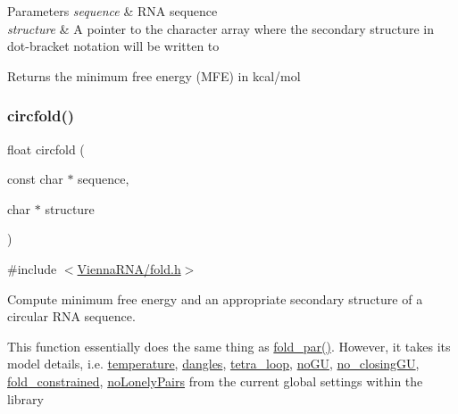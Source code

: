 \begin{DoxyParams}{Parameters}
{\em sequence} & R\+NA sequence \\
\hline
{\em structure} & A pointer to the character array where the secondary structure in dot-\/bracket notation will be written to \\
\hline
\end{DoxyParams}
\begin{DoxyReturn}{Returns}
the minimum free energy (M\+FE) in kcal/mol 
\end{DoxyReturn}
\mbox{\label{group__mfe__global__deprecated_ga4ac63ab3e8d9a80ced28b8052d94e423}} 
\subsubsection{\texorpdfstring{circfold()}{circfold()}}
{\footnotesize\ttfamily float circfold (\begin{DoxyParamCaption}\item[{const char $\ast$}]{sequence,  }\item[{char $\ast$}]{structure }\end{DoxyParamCaption})}



{\ttfamily \#include $<$\hyperlink{fold_8h}{Vienna\+R\+N\+A/fold.\+h}$>$}



Compute minimum free energy and an appropriate secondary structure of a circular R\+NA sequence. 

This function essentially does the same thing as \hyperlink{group__mfe__global__deprecated_ga2bc41df5d71fee6fd8da9904ee65d8fb}{fold\+\_\+par()}. However, it takes its model details, i.\+e. \hyperlink{group__model__details_gab4b11c8d9c758430960896bc3fe82ead}{temperature}, \hyperlink{group__model__details_ga72b511ed1201f7e23ec437e468790d74}{dangles}, \hyperlink{group__model__details_ga4f6265bdf0ead7ff4628a360adbfd77e}{tetra\+\_\+loop}, \hyperlink{group__model__details_gabf380d09e4f1ab94fc6af57cf0ad5d32}{no\+GU}, \hyperlink{group__model__details_gaa8d1c7b92489179e1eafa562b7bdd259}{no\+\_\+closing\+GU}, \hyperlink{fold__vars_8h_a0afc287c2464866d94858c39175154af}{fold\+\_\+constrained}, \hyperlink{group__model__details_ga097eccaabd6ae8b4fef83cccff85bb5d}{no\+Lonely\+Pairs} from the current global settings within the library

